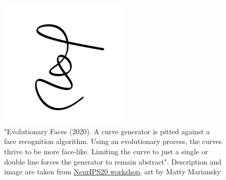 \documentclass{article}
\begin{document}
\begin{figure}[h]
	\centering
	\includegraphics[width=0.55\textwidth]{img/face.jpg}
	\caption{"Evolutionary Faces (2020). A curve generator is pitted against a face recognition algorithm. Using an evolutionary process, the curves thrive to be more face-like. Limiting the curve to just a single or double line forces the generator to remain abstract". Description and image are taken from \href{http://www.aiartonline.com/highlights-2020/matty-mariansky/}{NeurIPS20 workshop}, art by Matty Mariansky}
	\label{fig:diffsvg}
\end{figure}
\end{document}
